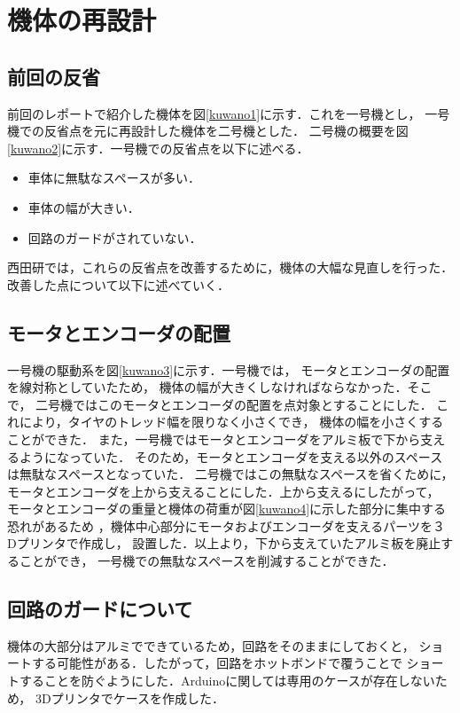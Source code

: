 \section{機体の再設計}
\subsection{前回の反省}
前回のレポートで紹介した機体を図\ref{kuwano1}に示す．これを一号機とし，
一号機での反省点を元に再設計した機体を二号機とした．
二号機の概要を図\ref{kuwano2}に示す．一号機での反省点を以下に述べる．

\begin{itemize}
 \item 車体に無駄なスペースが多い．
 \item 車体の幅が大きい．
 \item 回路のガードがされていない．
\end{itemize}

西田研では，これらの反省点を改善するために，機体の大幅な見直しを行った．
改善した点について以下に述べていく．

\subsection{モータとエンコーダの配置}
一号機の駆動系を図\ref{kuwano3}に示す．一号機では，
モータとエンコーダの配置を線対称としていたため，
機体の幅が大きくしなければならなかった．そこで，
二号機ではこのモータとエンコーダの配置を点対象とすることにした．
これにより，タイヤのトレッド幅を限りなく小さくでき，
機体の幅を小さくすることができた．
また，一号機ではモータとエンコーダをアルミ板で下から支えるようになっていた．
そのため，モータとエンコーダを支える以外のスペースは無駄なスペースとなっていた．
二号機ではこの無駄なスペースを省くために，
モータとエンコーダを上から支えることにした．上から支えるにしたがって，
モータとエンコーダの重量と機体の荷重が図\ref{kuwano4}に示した部分に集中する恐れがあるため
，機体中心部分にモータおよびエンコーダを支えるパーツを３Dプリンタで作成し，
設置した．以上より，下から支えていたアルミ板を廃止することができ，
一号機での無駄なスペースを削減することができた．

\subsection{回路のガードについて}
機体の大部分はアルミでできているため，回路をそのままにしておくと，
ショートする可能性がある．したがって，回路をホットボンドで覆うことで
ショートすることを防ぐようにした．Arduinoに関しては専用のケースが存在しないため，
3Dプリンタでケースを作成した．


